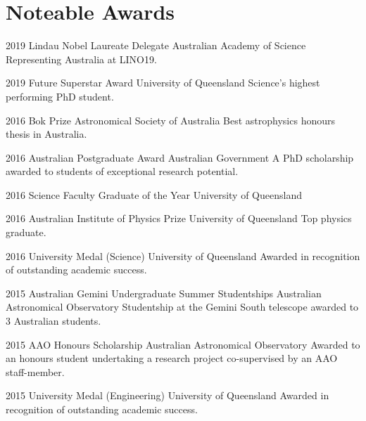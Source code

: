 \section{Noteable Awards}
\begin{entrylist}
	\entryInline
	{2019} %
	{Lindau Nobel Laureate Delegate}
	{Australian Academy of Science}
	{Representing Australia at LINO19.}
\end{entrylist}
\begin{entrylist}
	\entryInline
	{2019} %
	{Future Superstar Award}
	{University of Queensland}
	{Science's highest performing PhD student.}
\end{entrylist}
\begin{entrylist}
	\entryInline
	{2016} %
	{Bok Prize}
	{Astronomical Society of Australia}
	{Best astrophysics honours thesis in Australia.}
\end{entrylist}
\begin{entrylist}
	\entryInlineSmall
	{2016} %
	{Australian Postgraduate Award}
	{Australian Government}
	{A PhD scholarship awarded to students of exceptional research potential.}
\end{entrylist}
\begin{entrylist}
	\entryInlineSmall
	{2016} %
	{Science Faculty Graduate of the Year}
	{University of Queensland}
	{}
\end{entrylist}
\begin{entrylist}
	\entryInline
	{2016} %
	{Australian Institute of Physics Prize}
	{University of Queensland}
	{Top physics graduate.}
\end{entrylist}
\begin{entrylist}
	\entryInlineSmall
	{2016} %
	{University Medal (Science)}
	{University of Queensland}
	{Awarded in recognition of outstanding academic success.}
\end{entrylist}
\begin{entrylist}
	\entryInlineSmall
	{2015} %
	{Australian Gemini Undergraduate Summer Studentships}
	{Australian Astronomical Observatory}
	{Studentship at the Gemini South telescope awarded to 3 Australian students.}
\end{entrylist}
\begin{entrylist}
	\entryInlineSmall
	{2015} %
	{AAO Honours Scholarship}
	{Australian Astronomical Observatory}
	{Awarded to an honours student undertaking a research project co-supervised by an AAO staff-member.}
\end{entrylist}
\begin{entrylist}
	\entryInlineSmall
	{2015} %
	{University Medal (Engineering)}
	{University of Queensland}
	{Awarded in recognition of outstanding academic success.}
\end{entrylist}


